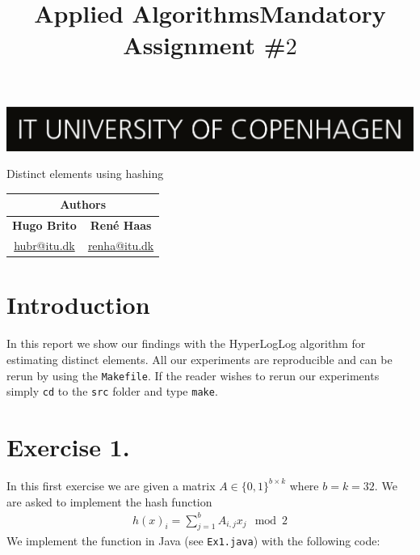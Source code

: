 \documentclass{tufte-handout}
\title{Applied Algorithms\newline Mandatory Assignment \#$2$}
\begin{document}
\thispagestyle{empty}

\maketitle
\includegraphics[width=\textwidth]{logo_en.png}

\vspace{10mm}\noindent %

\begin{center}
{\LARGE Distinct elements using hashing}
\end{center}

\vspace{5mm}\noindent %

\begin{table}[!h]
\centering
\begin{tabular}{cc}
\multicolumn{2}{c}{Authors}                                   \\ \hline
\multicolumn{1}{c|}{\textbf{Hugo Brito}} & \textbf{René Haas} \\
\multicolumn{1}{c|}{\href{mailto:hubr@itu.dk}{hubr@itu.dk}}         & \href{mailto:renha@itu.dk}{renha@itu.dk}       \\ \hline
\end{tabular}
\end{table}

\vspace{5mm} %


\section{Introduction}

In this report we show our findings with the HyperLogLog algorithm for estimating distinct elements.
All our experiments are reproducible and can be rerun by using the {\tt Makefile}. If the reader wishes to rerun our experiments simply {\tt cd} to the {\tt src} folder and type {\tt make}.

\section{\textbf{Exercise 1.}}
In this first exercise we are given a matrix $A\in\{0,1\}^{b\times k}$ where $b=k=32$. We are asked to implement the hash function
\begin{align*}
  h(x)_i = \sum_{j=1}^b A_{i,j}x_j \mod 2
\end{align*}
We implement the function in Java (see {\tt Ex1.java})
with the following code:
\end{document}

